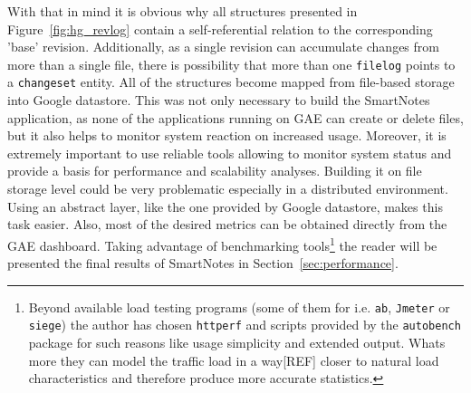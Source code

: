 With that in mind it is obvious why all structures presented in Figure~\ref{fig:hg_revlog} contain a self-referential relation to the corresponding 'base' revision. Additionally, as a single revision can accumulate changes from more than a single file, there is possibility that more than one \texttt{filelog} points to a \texttt{changeset} entity. All of the structures become mapped from file-based storage into Google datastore. This was not only necessary to build the SmartNotes application, as none of the applications running on GAE can create or delete files, but it also helps to monitor system reaction on increased usage. Moreover, it is extremely important to use reliable tools allowing to monitor system status and provide a basis for performance and scalability analyses. Building it on file storage level could be very problematic especially in a distributed environment. Using an abstract layer, like the one provided by Google datastore, makes this task easier. Also, most of the desired metrics can be obtained directly from the GAE dashboard. Taking advantage of benchmarking tools\footnote{Beyond available load testing programs (some of them for i.e. \texttt{ab}, \texttt{Jmeter} or \texttt{siege}) the author has chosen \texttt{httperf} and scripts provided by the \texttt{autobench} package for such reasons like usage simplicity and extended output. Whats more they can model  the traffic load in a way[REF] closer to natural load characteristics and therefore produce more accurate statistics.} the reader will be presented  the final results of SmartNotes in Section~\ref{sec:performance}.
 
